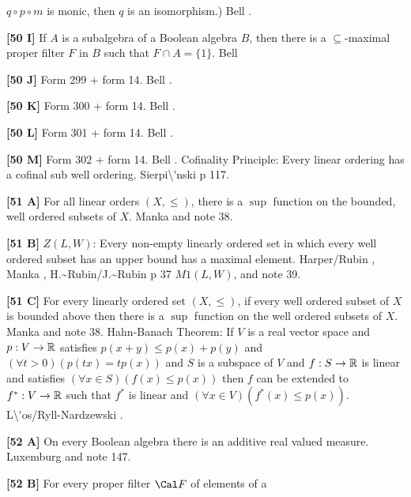 $q\circ p\circ m$ is monic, then $q$ is an isomorphism.)  \ac{Bell}
\cite{1988}.
\smallskip
\item{}{\bf [50 I]}  If $A$ is a subalgebra of a Boolean algebra $B$, then
there is a $\subseteq$-maximal proper filter $F$ in $B$ such that $F\cap A=
\{ 1\}$.  \ac{Bell} \cite{1988}
\smallskip
\item{}{\bf [50 J]} Form 299 + form 14.  \ac{Bell} \cite{1988}.
\smallskip
\item{}{\bf [50 K]} Form 300 + form 14.  \ac{Bell} \cite{1988}.
\smallskip
\item{}{\bf [50 L]} Form 301 + form 14.  \ac{Bell} \cite{1988}.
\smallskip
\item{}{\bf [50 M]} Form 302 + form 14.  \ac{Bell} \cite{1988}.
\medskip
{} Cofinality Principle: Every linear ordering has a
cofinal sub well ordering.  \ac{Sierpi\'nski} \cite{1918} p 117.
\smallskip
\item{}{\bf [51 A]}  For all linear orders $(X,\le )$, there is a $\sup$
function on the bounded, well ordered subsets of $X$.  \ac{Manka}
\cite{1988a} and note 38.
\smallskip
\item{}{\bf [51 B]}  $Z(L,W)$:  Every non-empty linearly ordered set in
which every well ordered subset has  an  upper  bound  has  a  maximal
element.  \ac{Harper/Rubin} \cite{1976},  \ac{Manka} \cite{1988a},
\ac{H.~Rubin/J.~Rubin}
\cite{1985} p 37 $M1(L,W)$, and note 39.
\smallskip
\item{}{\bf [51 C]}  For  every  linearly  ordered  set $(X,\le )$,  if
every well ordered subset of $X$ is bounded above then there is a $\sup$
function on the well ordered subsets of $X$.  \ac{Manka}
\cite{1988a} and note 38.
\medskip
{} Hahn-Banach Theorem:  If $V$ is a real vector space
and $p: V \rightarrow {\Bbb R}$ satisfies $p(x+y) \le p(x) + p(y)$ and
$(\forall t > 0)( p(tx) = tp(x) )$ and $S$ is a subspace of $V$ and
$f:S \rightarrow {\Bbb R}$ is linear and satisfies $(\forall  x \in
S)( f(x) \le  p(x) )$ then $f$ can be extended to $f^{*} : V \rightarrow
{\Bbb R}$ such that $f^{*}$ is linear and $(\forall x \in V)(f^{*}(x)
\le p(x))$.  \ac{L\'os/Ryll-Nardzewski} \cite{1951}. 
\smallskip
\item{}{\bf [52 A]}  On every Boolean algebra there is an additive real
valued measure.  \ac{Luxemburg} \cite{1969} and note 147.
\smallskip
\item{}{\bf [52 B]} For every proper filter $\Cal F$ of elements of a
